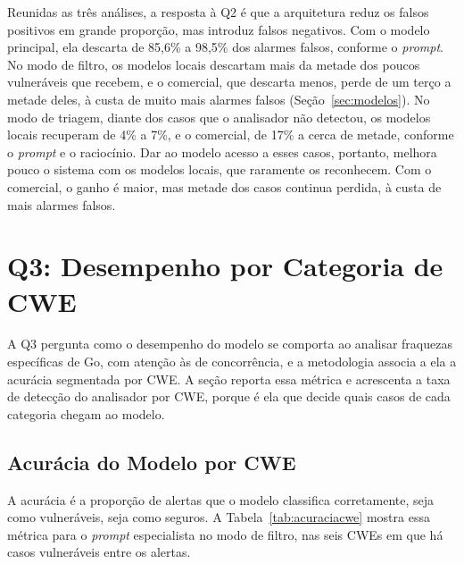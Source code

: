 Reunidas as três análises, a resposta à Q2 é que a arquitetura reduz os falsos positivos em grande proporção, mas introduz falsos negativos. Com o modelo principal, ela descarta de 85,6\% a 98,5\% dos alarmes falsos, conforme o \textit{prompt}. No modo de filtro, os modelos locais descartam mais da metade dos poucos vulneráveis que recebem, e o comercial, que descarta menos, perde de um terço a metade deles, à custa de muito mais alarmes falsos (Seção~\ref{sec:modelos}). No modo de triagem, diante dos casos que o analisador não detectou, os modelos locais recuperam de 4\% a 7\%, e o comercial, de 17\% a cerca de metade, conforme o \textit{prompt} e o raciocínio. Dar ao modelo acesso a esses casos, portanto, melhora pouco o sistema com os modelos locais, que raramente os reconhecem. Com o comercial, o ganho é maior, mas metade dos casos continua perdida, à custa de mais alarmes falsos.

\section{Q3: Desempenho por Categoria de CWE}
\label{sec:q3}

A Q3 pergunta como o desempenho do modelo se comporta ao analisar fraquezas específicas de Go, com atenção às de concorrência, e a metodologia associa a ela a acurácia segmentada por CWE. A seção reporta essa métrica e acrescenta a taxa de detecção do analisador por CWE, porque é ela que decide quais casos de cada categoria chegam ao modelo.

\subsection{Acurácia do Modelo por CWE}
\label{subsec:q3acuracia}

A acurácia é a proporção de alertas que o modelo classifica corretamente, seja como vulneráveis, seja como seguros. A Tabela~\ref{tab:acuraciacwe} mostra essa métrica para o \textit{prompt} especialista no modo de filtro, nas seis CWEs em que há casos vulneráveis entre os alertas.

